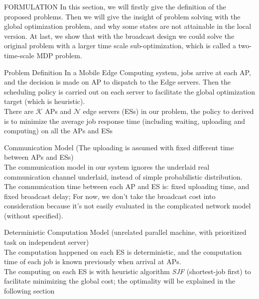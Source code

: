\documentclass[10pt, conference, letterpaper]{IEEEtran}
\begin{document}
    \begin{section}{FORMULATION}
        \label{sec:formulation}
        In this section, we will firstly give the definition of the proposed problems. Then we will give the insight of problem solving with the global optimization problem, and why some states are not attainable in the local version. At last, we show that with the broadcast design we could solve the original problem with a larger time scale sub-optimization, which is called a two-time-scale MDP problem.

        \begin{subsection}{Problem Definition}
            In a Mobile Edge Computing system, jobs arrive at each AP, and the decision is made on AP to dispatch to the Edge servers. Then the scheduling policy is carried out on each server to facilitate the global optimization target (which is heuristic).
            \\
            There are $\mathcal{K}$ APs and $\mathcal{N}$ edge servers (ESs) in our problem, the policy to derived is to minimize the average job response time (including waiting, uploading and computing) on all the APs and ESs

            \begin{subsubsection}{Communication Model}
                (The uploading is assumed with fixed different time between APs and ESs) \\
                The communication model in our system ignores the underlaid real communication channel underlaid, instead of simple probabilistic distribution.
                The communication time between each AP and ES is: fixed uploading time, and fixed broadcast delay;
                For now, we don't take the broadcast cost into consideration because it's not easily evaluated in the complicated network model (without specified).
            \end{subsubsection}

            \begin{subsubsection}{Deterministic Computation Model}
                (unrelated parallel machine, with prioritized task on independent server) \\
                The computation happened on each ES is deterministic, and the computation time of each job is known previously when arrival at APs. \\
                The computing on each ES is with heuristic algorithm \emph{SJF} (shortest-job first) to facilitate minimizing the global cost; the optimality will be explained in the following section 
            \end{subsubsection}


\end{subsection}
\end{section}
\end{document}
